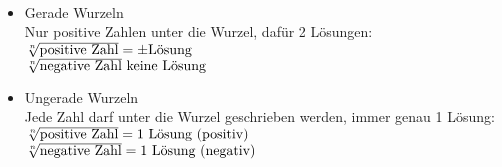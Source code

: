 \begin{minipage}{\textwidth}
\end{minipage}\\
\begin{itemize}
	\item[\textcolor{loes}{\textbullet}] \textcolor{loes}{Gerade Wurzeln}\\
	\textcolor{loes}{Nur positive Zahlen unter die Wurzel, dafür 2 Lösungen:}\\
	\textcolor{loes}{\(\sqrt[\leftroot{0}\uproot{1}n]{\text{positive Zahl}}=\pm\text{Lösung}\)}\\
	\textcolor{loes}{\(\sqrt[\leftroot{0}\uproot{1}n]{\text{negative Zahl}}\text{ keine Lösung}\)\Lightning}
	\item[\textcolor{loes}{\textbullet}] \textcolor{loes}{Ungerade Wurzeln}\\
	\textcolor{loes}{Jede Zahl darf unter die Wurzel geschrieben werden, immer genau 1 Lösung:}\\
	\textcolor{loes}{\(\sqrt[\leftroot{0}\uproot{1}n]{\text{positive Zahl}}=\text{1 Lösung (positiv)}\)}\\
	\textcolor{loes}{\(\sqrt[\leftroot{0}\uproot{1}n]{\text{negative Zahl}}=\text{1 Lösung (negativ)}\)}
\end{itemize}